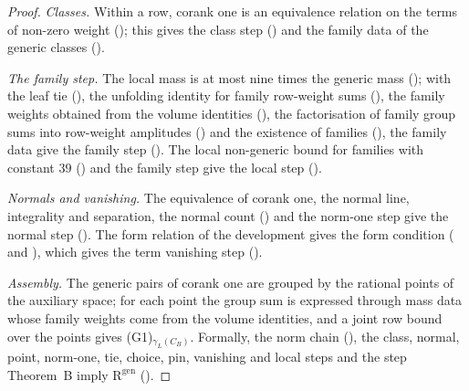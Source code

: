 \begin{proof}
\emph{Classes.} Within a row, corank one is an equivalence relation on the terms of non-zero weight
(); this gives the class step
() and the family data of the generic classes ().

\emph{The family step.} The local mass is at most nine times the generic mass ();
with the leaf tie (), the unfolding identity for family row-weight sums
(), the family weights obtained from the volume identities
(), the factorisation of family group sums into row-weight amplitudes
() and the existence of families
(), the family data give the family step (). The local
non-generic bound for families with constant $39$ () and the family step give
the local step ().

\emph{Normals and vanishing.} The equivalence of corank one, the normal line, integrality and separation, the normal count
() and the norm-one step give the normal step
(). The form relation of the development gives the form condition
( and ), which gives the term vanishing step
().

\emph{Assembly.} The generic pairs of corank one are grouped by the rational points of the auxiliary space; for each point the group sum
is expressed through mass data whose family weights come from the volume identities, and a joint row bound over the points gives
(G1)$_{\gamma_L(C_B)}$. Formally, the norm chain (), the class, normal, point, norm-one,
tie, choice, pin, vanishing and local steps and the step Theorem~B imply $\mathrm{R}^{\mathrm{gen}}$
().
\end{proof}

